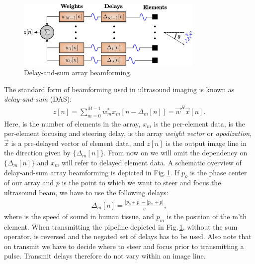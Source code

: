 \begin{figure}
\centering
\includegraphics[width=0.8\textwidth]{img/beamforming_das.eps}
\caption{Delay-and-sum array beamforming.}
\label{fig:das_background}
\end{figure}

The standard form of beamforming used in ultrasound imaging is known as \textit{delay-and-sum} (DAS): 
\begin{align}\label{eq:das_background}
z[n] = \sum_{m = 0}^{M-1}w_m^*x_m[n - \Delta_m[n]] = \vec{w}^H\vec{x}[n].
\end{align}
Here,  is the number of elements in the array, $x_m$ is the per-element data,  is the per-element focusing and steering delay,  is the array \textit{weight vector} or \textit{apodization}, $\vec{x}$ is a pre-delayed vector of element data, and $z[n]$ is the output image line in the direction given by $\{\Delta_m[n]\}$.  From now on we will omit the dependency on $\{\Delta_m[n]\}$ and $x_m$ will refer to delayed element data. A schematic overview of delay-and-sum array beamforming is depicted in Fig.\,\ref{fig:das_background}. If $p_o$ is the phase center of our array and $p$ is the point to which we want to steer and focus the ultrasound beam, we have to use the following delays:
\begin{align}
\Delta_m[n] =\frac{|p_o+p| - |p_m+p|}{c},
\end{align}
where  is the speed of sound in human tissue, and $p_m$ is the position of the m'th element. When transmitting the pipeline depicted in Fig.\,\ref{fig:das_background}, without the sum operator, is reversed and the negated set of delays has to be used. Also note that on transmit we have to decide where to steer and focus prior to transmitting a pulse. Transmit delays therefore do not vary within an image line.


